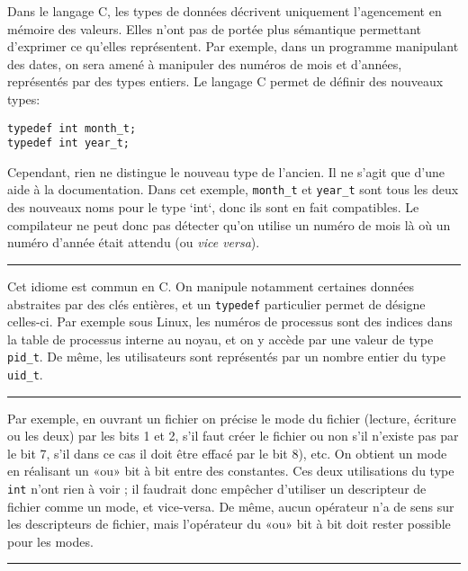 Dans le langage C, les types de données décrivent uniquement l'agencement en
mémoire des valeurs. Elles n'ont pas de portée plus sémantique permettant
d'exprimer ce qu'elles représentent. Par exemple, dans un programme manipulant
des dates, on sera amené à manipuler des numéros de mois et d'années,
représentés par des types entiers. Le langage C permet de définir des nouveaux
types:

\begin{verbatim}
typedef int month_t;
typedef int year_t;
\end{verbatim}

Cependant, rien ne distingue le nouveau type de l'ancien. Il ne s'agit que d'une
aide à la documentation. Dans cet exemple, \texttt{month\_t} et \texttt{year\_t}
sont tous les deux des nouveaux noms pour le type `int`, donc ils sont en fait
compatibles. Le compilateur ne peut donc pas détecter qu'on utilise un numéro de
mois là où un numéro d'année était attendu (ou \emph{vice versa}).

\begin{center}\rule{3in}{0.4pt}\end{center}

Cet idiome est commun en C. On manipule notamment certaines données abstraites
par des clés entières, et un \texttt{typedef} particulier permet de désigne
celles-ci. Par exemple sous Linux, les numéros de processus sont des indices
dans la table de processus interne au noyau, et on y accède par une valeur de
type \texttt{pid\_t}. De même, les utilisateurs sont représentés par un nombre
entier du type \texttt{uid\_t}.

\begin{center}\rule{3in}{0.4pt}\end{center}

\def\tBits{\textsc{Bits}\xspace}

Par exemple, en ouvrant un fichier on précise le mode du fichier (lecture,
écriture ou les deux) par les bits 1 et 2, s'il faut créer le fichier ou non
s'il n'existe pas par le bit 7, s'il dans ce cas il doit être effacé par le bit
8), etc. On obtient un mode en réalisant un «ou» bit à bit entre des
constantes. Ces deux utilisations du type \texttt{int} n'ont rien à voir ; il
faudrait donc empêcher d'utiliser un descripteur de fichier comme un mode, et
vice-versa. De même, aucun opérateur n'a de sens sur les descripteurs de
fichier, mais l'opérateur \texttt{\textbar{}} du «ou» bit à bit doit rester
possible pour les modes.

\begin{center}\rule{3in}{0.4pt}\end{center}


